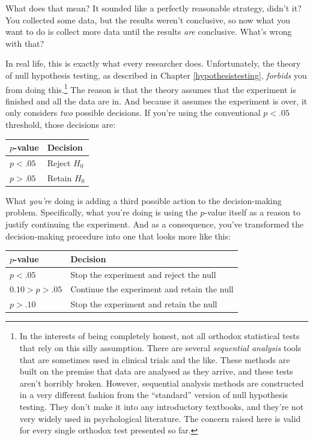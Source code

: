 \documentclass[
  11pt,
  a4paper,
  twoside,symmetric,openright]{book}
\theoremstyle{break}
\theoremstyle{break}
\begin{document}
What does that mean? It sounded like a perfectly reasonable strategy, didn't it? You collected some data, but the results weren't conclusive, so now what you want to do is collect more data until the results \emph{are} conclusive. What's wrong with that?

In real life, this is exactly what every researcher does. Unfortunately, the theory of null hypothesis testing, as described in Chapter \ref{hypothesistesting}, \emph{forbids} you from doing this.\footnote{In the interests of being completely honest, not all orthodox statistical tests that rely on this silly assumption. There are several \emph{sequential analysis} tools that are sometimes used in clinical trials and the like. These methods are built on the premise that data are analysed as they arrive, and these tests aren't horribly broken. However, sequential analysis methods are constructed in a very different fashion from the ``standard'' version of null hypothesis testing. They don't make it into any introductory textbooks, and they're not very widely used in psychological literature. The concern raised here is valid for every single orthodox test presented so far.} The reason is that the theory assumes that the experiment is finished and all the data are in. And because it assumes the experiment is over, it only considers \emph{two} possible decisions. If you're using the conventional \(p<.05\) threshold, those decisions are:

\begin{longtable}[]{@{}ll@{}}
\toprule\noalign{}
\(p\)-value & Decision \\
\midrule\noalign{}
\endhead
\bottomrule\noalign{}
\endlastfoot
\(p < .05\) & Reject \(H_0\) \\
\(p > .05\) & Retain \(H_0\) \\
\end{longtable}

What \emph{you're} doing is adding a third possible action to the decision-making problem. Specifically, what you're doing is using the \(p\)-value itself as a reason to justify continuing the experiment. And as a consequence, you've transformed the decision-making procedure into one that looks more like this:

\begin{longtable}[]{@{}ll@{}}
\toprule\noalign{}
\(p\)-value & Decision \\
\midrule\noalign{}
\endhead
\bottomrule\noalign{}
\endlastfoot
\(p < .05\) & Stop the experiment and reject the null \\
\(0.10 > p > .05\) & Continue the experiment and retain the null \\
\(p > .10\) & Stop the experiment and retain the null \\
\end{longtable}
\end{document}
